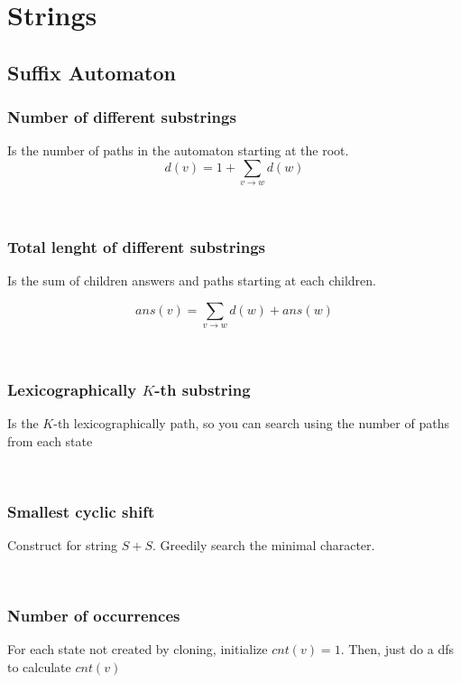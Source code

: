 \chapter{Strings}


\section{Suffix Automaton}
\subsection{Number of different substrings}
        Is the number of paths in the automaton starting at the root.
        $$d(v) = 1 + \sum_{v \rightarrow w} d(w)$$

\

\subsection{Total lenght of different substrings}
        Is the sum of children answers and paths starting 
        at each children.
        
        $$ans(v) = \sum_{v \rightarrow w} d(w) + ans(w)$$

\


\subsection{Lexicographically $K$-th substring}
        Is the $K$-th lexicographically path, so you can search using the number of paths from each state

\

\subsection{Smallest cyclic shift}
        Construct for string $S + S$. Greedily search 
        the minimal character.

\


\subsection{Number of occurrences}
        For each state not created by cloning, initialize $cnt(v) = 1$. 
        Then, just do a dfs to calculate $cnt(v)$
        
